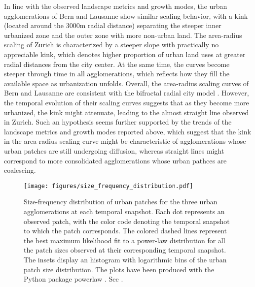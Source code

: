 \documentclass[10pt,letterpaper]{article}
\begin{document}
In line with the observed landscape metrics and growth modes, the urban agglomerations of Bern and Lausanne show similar scaling behavior, with a kink (located around the 3000m radial distance) separating the steeper inner urbanized zone and the outer zone with more non-urban land.
The area-radius scaling of Zurich is characterized by a steeper slope with practically no appreciable kink, which denotes higher proportion of urban land uses at greater radial distances from the city center.
At the same time, the curves become steeper through time in all agglomerations, which reflects how they fill the available space as urbanization unfolds.
Overall, the area-radius scaling curves of Bern and Lausanne are consistent with the bifractal radial city model \cite{white1993cellular,white2015modeling}. %
However, the temporal evolution of their scaling curves suggests that as they become more urbanized, the kink might attenuate, leading to the almost straight line observed in Zurich. %
Such an hypothesis seems further supported by the trends of the landscape metrics and growth modes reported above, which suggest that the kink in the area-radius scaling curve might be characteristic of agglomerations whose urban patches are still undergoing diffusion, whereas straight lines might correspond to more consolidated agglomerations whose urban pathces are coalescing.


\begin{figure}[!ht]
  \begin{adjustwidth}{-.4\textwidth}{0cm}
    \centering
    \texttt{[image: figures/size\_frequency\_distribution.pdf]}
    \vspace{.5em}
    \caption[Size-frequency distribution of urban patches]{\label{figures/size_frequency_distribution.pdf}Size-frequency distribution of urban patches for the three urban agglomerations at each temporal snapshot. Each dot represents an observed patch, with the color code denoting the temporal snapshot to which the patch corresponds. The colored dashed lines represent the best maximum likelihood fit to a power-law distribution for all the patch sizes observed at their corresponding temporal snapshot. The insets display an histogram with logarithmic bins of the urban patch size distribution. The plots have been produced with the Python package powerlaw \cite{alstott2014powerlaw}. See .}
  \end{adjustwidth}
\end{figure}
\end{document}
